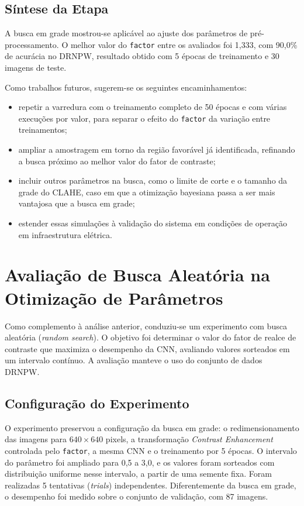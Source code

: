 \subsection{Síntese da Etapa}

A busca em grade mostrou-se aplicável ao ajuste dos parâmetros de pré-processamento. O melhor valor do \texttt{factor} entre os avaliados foi 1,333, com 90,0\% de acurácia no DRNPW, resultado obtido com 5 épocas de treinamento e 30 imagens de teste.

Como trabalhos futuros, sugerem-se os seguintes encaminhamentos:
\begin{itemize}
    \item repetir a varredura com o treinamento completo de 50 épocas e com várias execuções por valor, para separar o efeito do \texttt{factor} da variação entre treinamentos;
    \item ampliar a amostragem em torno da região favorável já identificada, refinando a busca próximo ao melhor valor do fator de contraste;
    \item incluir outros parâmetros na busca, como o limite de corte e o tamanho da grade do CLAHE, caso em que a otimização bayesiana \cite{snoek2012practical} passa a ser mais vantajosa que a busca em grade;
    \item estender essas simulações à validação do sistema em condições de operação em infraestrutura elétrica.
\end{itemize}

\section{Avaliação de Busca Aleatória na Otimização de Parâmetros}

Como complemento à análise anterior, conduziu-se um experimento com busca aleatória (\textit{random search}). O objetivo foi determinar o valor do fator de realce de contraste que maximiza o desempenho da CNN, avaliando valores sorteados em um intervalo contínuo. A avaliação manteve o uso do conjunto de dados DRNPW.

\subsection{Configuração do Experimento}

O experimento preservou a configuração da busca em grade: o redimensionamento das imagens para $640 \times 640$ pixels, a transformação \textit{Contrast Enhancement} controlada pelo \texttt{factor}, a mesma CNN e o treinamento por 5 épocas. O intervalo do parâmetro foi ampliado para 0,5 a 3,0, e os valores foram sorteados com distribuição uniforme nesse intervalo, a partir de uma semente fixa. Foram realizadas 5 tentativas (\textit{trials}) independentes. Diferentemente da busca em grade, o desempenho foi medido sobre o conjunto de validação, com 87 imagens.


